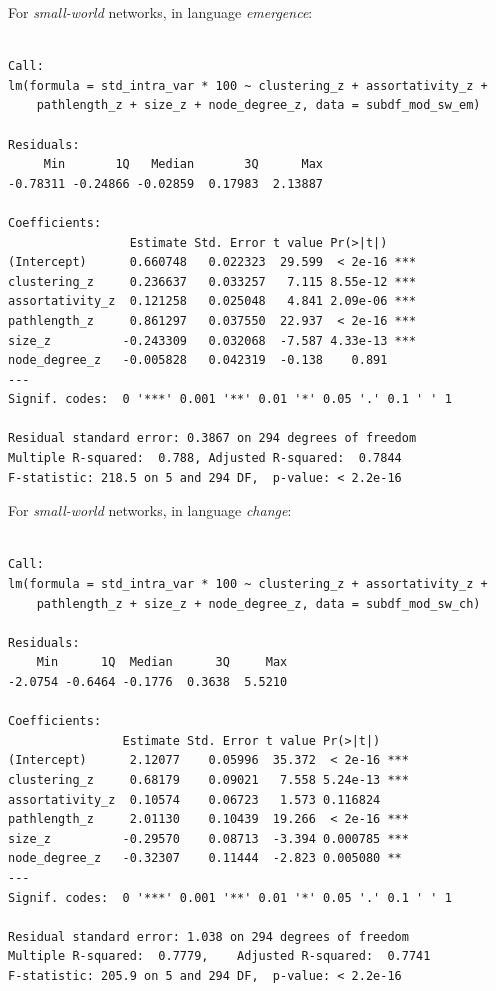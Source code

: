 \documentclass[
]{article}
\begin{document}
For \emph{small-world} networks, in language \emph{emergence}:

\begin{verbatim}

Call:
lm(formula = std_intra_var * 100 ~ clustering_z + assortativity_z + 
    pathlength_z + size_z + node_degree_z, data = subdf_mod_sw_em)

Residuals:
     Min       1Q   Median       3Q      Max 
-0.78311 -0.24866 -0.02859  0.17983  2.13887 

Coefficients:
                 Estimate Std. Error t value Pr(>|t|)    
(Intercept)      0.660748   0.022323  29.599  < 2e-16 ***
clustering_z     0.236637   0.033257   7.115 8.55e-12 ***
assortativity_z  0.121258   0.025048   4.841 2.09e-06 ***
pathlength_z     0.861297   0.037550  22.937  < 2e-16 ***
size_z          -0.243309   0.032068  -7.587 4.33e-13 ***
node_degree_z   -0.005828   0.042319  -0.138    0.891    
---
Signif. codes:  0 '***' 0.001 '**' 0.01 '*' 0.05 '.' 0.1 ' ' 1

Residual standard error: 0.3867 on 294 degrees of freedom
Multiple R-squared:  0.788, Adjusted R-squared:  0.7844 
F-statistic: 218.5 on 5 and 294 DF,  p-value: < 2.2e-16
\end{verbatim}

For \emph{small-world} networks, in language \emph{change}:

\begin{verbatim}

Call:
lm(formula = std_intra_var * 100 ~ clustering_z + assortativity_z + 
    pathlength_z + size_z + node_degree_z, data = subdf_mod_sw_ch)

Residuals:
    Min      1Q  Median      3Q     Max 
-2.0754 -0.6464 -0.1776  0.3638  5.5210 

Coefficients:
                Estimate Std. Error t value Pr(>|t|)    
(Intercept)      2.12077    0.05996  35.372  < 2e-16 ***
clustering_z     0.68179    0.09021   7.558 5.24e-13 ***
assortativity_z  0.10574    0.06723   1.573 0.116824    
pathlength_z     2.01130    0.10439  19.266  < 2e-16 ***
size_z          -0.29570    0.08713  -3.394 0.000785 ***
node_degree_z   -0.32307    0.11444  -2.823 0.005080 ** 
---
Signif. codes:  0 '***' 0.001 '**' 0.01 '*' 0.05 '.' 0.1 ' ' 1

Residual standard error: 1.038 on 294 degrees of freedom
Multiple R-squared:  0.7779,    Adjusted R-squared:  0.7741 
F-statistic: 205.9 on 5 and 294 DF,  p-value: < 2.2e-16
\end{verbatim}
\end{document}

